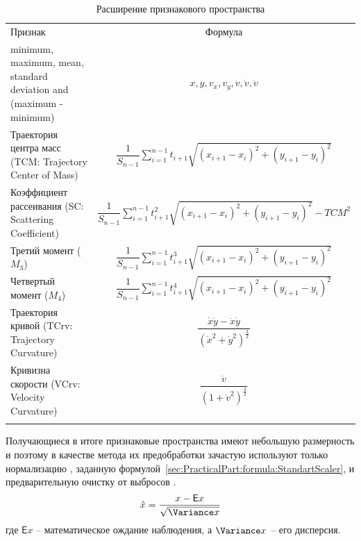 \documentclass[12pt]{article}
\begin{document}
    \begin{table}[h]
        \centering
        \renewcommand{\arraystretch}{1.3}
        \renewcommand{\tabcolsep}{2mm}
        \caption{Расширение признакового пространства}
        \begin{tabular}{ || m{60mm} | c ||}
            \hhline{|t:==:t|} 
            Признак & Формула \\ [2mm]
            \hhline{|:==:|}
            minimum, maximum, mean, standard deviation and (maximum - minimum) & $x, y, v_x, v_y, v, \dot{v}, \ddot{v}$ \\
            \hhline{||-|-||}
            Траектория центра масс (TCM: Trajectory Center of Mass) & $ \dfrac{1}{S_{n-1}} \sum\limits_{i=1}^{n-1} t_{i+1} \sqrt{(x_{i+1} - x_{i})^2 + (y_{i+1} - y_{i})^2} $ \\
            \hhline{||-|-||}
            Коэффициент рассеивания (SC: Scattering Coefficient) &  $ \dfrac{1}{S_{n-1}} \sum\limits_{i=1}^{n-1} t_{i+1}^2 \sqrt{(x_{i+1} - x_{i})^2 + (y_{i+1} - y_{i})^2} - TCM^2 $ \\
            \hhline{||-|-||}
            Третий момент ($M_3$) & $ \dfrac{1}{S_{n-1}} \sum\limits_{i=1}^{n-1} t_{i+1}^3 \sqrt{(x_{i+1} - x_{i})^2 + (y_{i+1} - y_{i})^2} $ \\
            \hhline{||-|-||}
            Четвертый момент ($M_4$) & $ \dfrac{1}{S_{n-1}} \sum\limits_{i=1}^{n-1} t_{i+1}^4 \sqrt{(x_{i+1} - x_{i})^2 + (y_{i+1} - y_{i})^2} $ \\
            \hhline{||-|-||}
            Траектория кривой (TCrv: Trajectory Curvature) & $ \dfrac{\dot{x}\ddot{y} - \ddot{x}\dot{y}}{(\dot{x}^2 + \dot{y}^2)^\tfrac{3}{2}} $ \\
            \hhline{||-|-||}
            Кривизна скорости (VCrv: Velocity Curvature) & $ \dfrac{\ddot{v}}{(1 + \dot{v}^2)^\tfrac{3}{2}} $ \\
            \hhline{|b:==:b|}
        \end{tabular}
        \label{sec:Overview:Features:table:ArsFeaturesFormulas}
    \end{table}

    \par Получающиеся в итоге признаковые пространства имеют небольшую размерность и поэтому в качестве метода их предобработки зачастую используют только нормализацию \cite{Fridman, Kasprowski, Tan}, заданную формулой~\ref{sec:PracticalPart:formula:StandartScaler}, и предварительную очистку от выбросов \cite{Tan, Pilankar}.
    \begin{equation}
    \label{sec:PracticalPart:formula:StandartScaler}
        \hat{x}  = \frac{x - \mathsf{E} x}{\sqrt{\Variance x}}
    \end{equation}
    \noindent где $\mathsf{E} x$ -- математическое ождание наблюдения, а $\Variance x$ -- его дисперсия.
    \newpage
\end{document}
